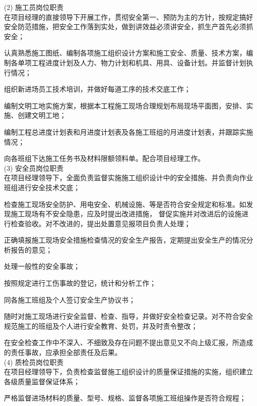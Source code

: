 (2) 施工员岗位职责\\

 在项目经理的直接领导下开展工作，贯彻安全第一、预防为主的方针，按规定搞好安全防范措施，把安全工作落到实处，做到讲效益必须讲安全，抓生产首先必须抓安全；

 认真熟悉施工图纸、编制各项施工组织设计方案和施工安全、质量、技术方案，编制各单项工程进度计划及人力、物力计划和机具、用具、设备计划。并监督计划执行情况；

 组织新进场员工技术培训，并做好每道工序的技术交底工作；

 编制文明工地实施方案，根据本工程施工现场合理规划布局现场平面图，安排、实施、创建文明工地；

 编制工程总进度计划表和月进度计划表及各施工班组的月进度计划表，并跟踪实施情况；

 向各班组下达施工任务书及材料限额领料单。配合项目经理工作。\\

(3) 安全员岗位职责\\

 在项目经理领导下，全面负责监督实施施工组织设计中的安全措施、并负责向作业班组进行安全技术交底；

 检查施工现场安全防护、用电安全、机械设施、等是否符合安全规定和标准。如发现施工现场有不安全隐患，应及时提出改进措施，
督促实施并对改进后的设施进行检查验收。对不改进的，提出处置意见报项目负责人处理；

 正确填报施工现场安全措施检查情况的安全生产报告，定期提出安全生产的情况分析报告的意见；

 处理一般性的安全事故；

 按照规定进行工伤事故的登记，统计和分析工作；

 同各施工班组及个人签订安全生产协议书；

 随时对施工现场进行安全监督、检查、指导，并做好安全检查记录。对不符合安全规范施工的班组及个人进行安全教育、处罚，并及时责令整改；

 在安全检查工作中不深入、不细致及存在问题不提出意见又不向上级汇报，所造成的责任事故，应承担全部责任及后果。\\

(4) 质检员岗位职责\\

 在项目经理领导下，负责检查监督施工组织设计的质量保证措施的实施，组织建立各级质量监督保证体系；

 严格监督进场材料的质量、型号、规格、监督各项施工班组操作是否符合规程；


